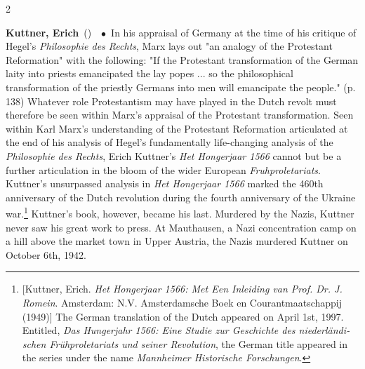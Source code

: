 \documentclass[10pt,a4paper,twoside]{article} %
\newcommand{\entry}[4]{\markboth{#1}{#1}\textbf{#1}\ {(#2)}\ \textit{#3}\ $\bullet$\ {#4}}  %
\begin{document}
\begin{multicols}{2}
\entry{Kuttner, Erich} {} {} {In his appraisal of Germany at the time of his critique of Hegel's \emph{Philosophie des Rechts}, Marx lays out "an analogy of the Protestant Reformation" with the following: "If the Protestant transformation of the German laity into priests emancipated the lay popes ... so the philosophical transformation of the priestly Germans into men will emancipate the people." (p. 138) Whatever role Protestantism may have played in the Dutch revolt must therefore be seen within Marx's appraisal of the Protestant transformation. Seen within Karl Marx's understanding of the Protestant Reformation articulated at the end of his analysis of Hegel's fundamentally life-changing analysis of the \emph{Philosophie des Rechts}, Erich Kuttner's \emph{Het Hongerjaar 1566} cannot but be a further articulation in the bloom of the wider European \emph{Fruhproletariats}. Kuttner's unsurpassed analysis in \emph{Het Hongerjaar 1566} marked the 460th anniversary of the Dutch revolution during the fourth anniversary of the Ukraine war.\footnote{[Kuttner, Erich. \emph{Het Hongerjaar 1566: Met Een Inleiding van Prof. Dr. J. Romein}. Amsterdam: N.V. Amsterdamsche Boek en Courantmaatschappij (1949)] The German translation of the Dutch appeared on April 1st, 1997. Entitled, \textgerman{\emph{Das Hungerjahr 1566: Eine Studie zur Geschichte des niederländischen Frühproletariats und seiner Revolution}}, the German title appeared in the series under the name \emph{Mannheimer Historische Forschungen}.} Kuttner's book, however, became his last. Murdered by the Nazis, Kuttner never saw his great work to press. At Mauthausen, a Nazi concentration camp on a hill above the market town in Upper Austria, the Nazis murdered Kuttner on October 6th, 1942. 
}


\end{multicols}
\end{document}
